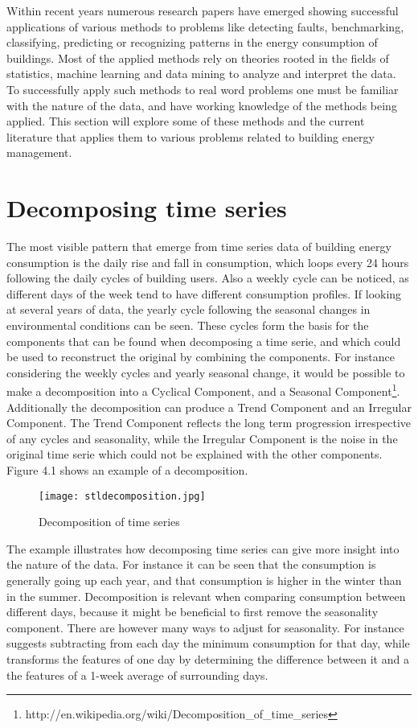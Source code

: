 Within recent years numerous research papers have emerged showing successful applications of various methods to problems like detecting faults, benchmarking, classifying, predicting or recognizing patterns in the energy consumption of buildings. Most of the applied methods rely on theories rooted in the fields of statistics, machine learning and data mining to analyze and interpret the data. To successfully apply such methods to real word problems one must be familiar with the nature of the data, and have working knowledge of the methods being applied. This section will explore some of these methods and the current literature that applies them to various problems related to building energy management.

\section{Decomposing time series}
The most visible pattern that emerge from time series data of building energy consumption is the daily rise and fall in consumption, which loops every 24 hours following the daily cycles of building users. Also a weekly cycle can be noticed, as different days of the week tend to have different consumption profiles. If looking at several years of data, the yearly cycle following the seasonal changes in environmental conditions can be seen. These cycles form the basis for the components that can be found when decomposing a time serie, and which could be used to reconstruct the original by combining the components. For instance considering the weekly cycles and yearly seasonal change, it would be possible to make a decomposition into a Cyclical Component, and a Seasonal Component\footnote{http://en.wikipedia.org/wiki/Decomposition\_of\_time\_series}. Additionally the decomposition can produce a Trend Component and an Irregular Component. The Trend Component reflects the long term progression irrespective of any cycles and seasonality, while the Irregular Component is the noise in the original time serie which could not be explained with the other components. Figure 4.1 shows an example of a decomposition.
\begin{figure}
\begin{center}
\texttt{[image: stldecomposition.jpg]}
\end{center}
\caption{Decomposition of time series}
\end{figure}
\newline
\newline
The example illustrates how decomposing time series can give more insight into the nature of the data. For instance it can be seen that the consumption is generally going up each year, and that consumption is higher in the winter than in the summer. Decomposition is relevant when comparing consumption between different days, because it might be beneficial to first remove the seasonality component. There are however many ways to adjust for seasonality. For instance \cite{faultdetec2} suggests subtracting from each day the minimum consumption for that day, while \cite{faultdetec4} transforms the features of one day by determining the difference
between it and a the features of a 1-week average of surrounding days. 

